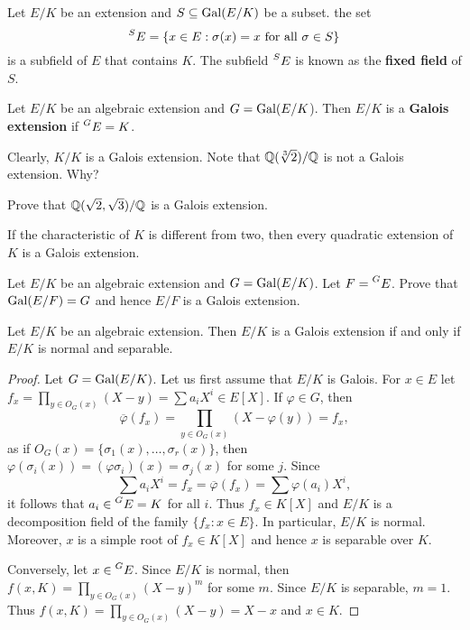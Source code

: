 Let $E/K$ be an extension and $S\subseteq\operatorname{Gal}(E/K)$ be a subset. 
the set 
\[
    \prescript{S}{}{E}=\{x\in E:\sigma(x)=x\text{ for all $\sigma\in S$}\}
\]
is a subfield of $E$ that contains $K$. The subfield $\prescript{S}{}{E}$
is known as the \textbf{fixed field} of $S$. 

\begin{definition}
    Let $E/K$ be an algebraic extension and $G=\operatorname{Gal}(E/K$). 
    Then $E/K$ is a \textbf{Galois extension} if $\prescript{G}{}{E}=K$. 
\end{definition}

Clearly, $K/K$ is a Galois extension. 
Note that $\mathbb{Q}(\sqrt[3]{2})/\mathbb{Q}$ is not a Galois extension. Why?

\begin{exercise}
    Prove that $\mathbb{Q}(\sqrt{2},\sqrt{3})/\mathbb{Q}$ is a Galois extension. 
\end{exercise}

\begin{exercise}
If the characteristic of $K$ is different from two, 
then every quadratic extension of $K$ is a Galois extension. 
\end{exercise}

\begin{exercise}
    Let $E/K$ be an algebraic extension and $G=\operatorname{Gal}(E/K)$. Let
    $F=\prescript{G}{}{E}$. Prove that $\operatorname{Gal}(E/F)=G$ and hence $E/F$ is a Galois extension. 
\end{exercise}

\begin{proposition}
\label{pro:normal+separable}
    Let $E/K$ be an algebraic extension. Then $E/K$ is a Galois extension
    if and only if $E/K$ is normal and separable. 
\end{proposition}

\begin{proof}
    Let $G=\operatorname{Gal}(E/K)$. Let us first assume that $E/K$ is Galois. For $x\in E$ let 
    $f_x=\prod_{y\in O_G(x)}(X-y)=\sum a_iX^i\in E[X]$. If $\varphi\in G$, then 
    \[
    \overline{\varphi}(f_x)=\prod_{y\in O_G(x)}(X-\varphi(y))=f_x,
    \]
    as if $O_G(x)=\{\sigma_1(x),\dots,\sigma_r(x)\}$, then 
    $\varphi(\sigma_i(x))=(\varphi\sigma_i)(x)=\sigma_j(x)$ for some $j$. 
    Since 
    \[
    \sum a_iX^i=f_x=\overline{\varphi}(f_x)=\sum\varphi(a_i)X^i,
    \]
    it follows that $a_i\in\prescript{G}{}{E}=K$ for all $i$. 
    Thus $f_x\in K[X]$
    and $E/K$ is a decomposition field of the family $\{f_x:x\in E\}$. In particular, 
    $E/K$ is normal. Moreover, $x$ is a simple root of $f_x\in K[X]$ and hence
    $x$ is separable over $K$. 

    Conversely, let $x\in \prescript{G}{}{E}$. Since $E/K$ is normal, then 
    $f(x,K)=\prod_{y\in O_G(x)}(X-y)^m$ for some $m$. Since $E/K$ is separable, 
    $m=1$. Thus $f(x,K)=\prod_{y\in O_G(x)}(X-y)=X-x$ and $x\in K$. 
\end{proof}

